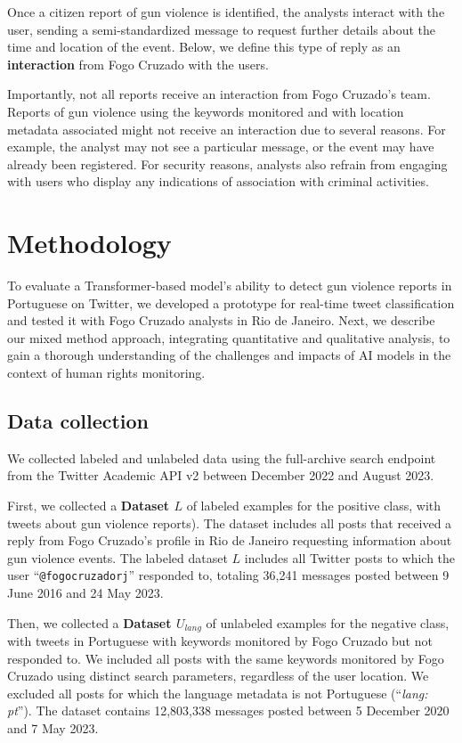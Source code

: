\documentclass[11pt,letterpaper]{article}
\begin{document}
Once a citizen report of gun violence is identified, the analysts interact with the user, sending a semi-standardized message to request further details about the time and location of the event. Below, we define this type of reply as an \textbf{interaction} from Fogo Cruzado with the users. 

Importantly, not all reports receive an interaction from Fogo Cruzado's team. Reports of gun violence using the keywords monitored and with location metadata associated might not receive an interaction due to several reasons. For example, the analyst may not see a particular message, or the event may have already been registered. For security reasons, analysts also refrain from engaging with users who display any indications of association with criminal activities. 

\section{Methodology}
\label{chap:methodology}
To evaluate a Transformer-based model's ability to detect gun violence reports in Portuguese on Twitter, we developed a prototype for real-time tweet classification and tested it with Fogo Cruzado analysts in Rio de Janeiro. Next, we describe our mixed method approach, integrating quantitative and qualitative analysis, to gain a thorough understanding of the challenges and impacts of AI models in the context of human rights monitoring.

\subsection{Data collection}
\label{subchap:datasource}
We collected labeled and unlabeled data using the full-archive search endpoint from the Twitter Academic API v2 between December 2022 and August 2023. 

First, we collected a \textbf{Dataset $L$} of labeled examples for the positive class, with tweets about gun violence reports). The dataset includes all posts that received a reply from Fogo Cruzado's profile in Rio de Janeiro requesting information about gun violence events. The labeled dataset $L$ includes all Twitter posts to which the user ``\nolinkurl{@fogocruzadorj}'' responded to, totaling 36,241 messages posted between 9 June 2016 and 24 May 2023.

Then, we collected a \textbf{Dataset $U_{lang}$} of unlabeled examples for the negative class, with tweets in Portuguese with keywords monitored by Fogo Cruzado but not responded to. We included all posts with the same keywords monitored by Fogo Cruzado using distinct search parameters, regardless of the user location. We excluded all posts for which the language metadata is not Portuguese (``\textit{lang: pt}''). The dataset contains 12,803,338 messages posted between 5 December 2020 and 7 May 2023.
\end{document}
